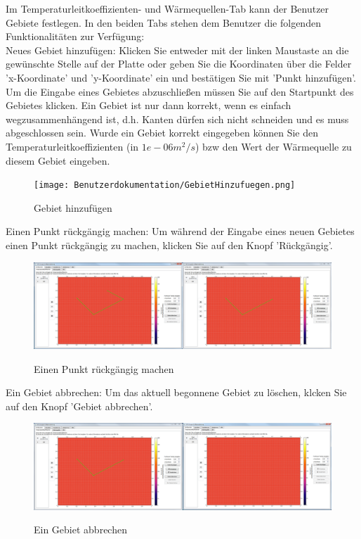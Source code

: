 \newpage
\noindent
Im Temperaturleitkoeffizienten- und Wärmequellen-Tab kann der Benutzer Gebiete festlegen. In den beiden Tabs stehen dem Benutzer die folgenden Funktionalitäten zur Verfügung:\\


\noindent
Neues Gebiet hinzufügen:
Klicken Sie entweder mit der linken Maustaste an die gewünschte Stelle auf der Platte oder geben Sie die Koordinaten über die Felder 'x-Koordinate' und 'y-Koordinate' ein und bestätigen Sie mit 'Punkt hinzufügen'. Um die Eingabe eines Gebietes abzuschließen müssen Sie auf den Startpunkt des Gebietes klicken. Ein Gebiet ist nur dann korrekt, wenn es einfach wegzusammenhängend ist, d.h. Kanten dürfen sich nicht schneiden und es muss abgeschlossen sein. Wurde ein Gebiet korrekt eingegeben können Sie den Temperaturleitkoeffizienten (in $1e-06 m^2/s$) bzw den Wert der Wärmequelle zu diesem Gebiet eingeben.
\begin{figure}[H]
\centering
\texttt{[image: Benutzerdokumentation/GebietHinzufuegen.png]}\\
\caption{Gebiet hinzufügen}
\label{Ein neues Gebiet hinzufügen}
\end{figure}

\newpage
\noindent
Einen Punkt rückgängig machen:
Um während der Eingabe eines neuen Gebietes einen Punkt rückgängig zu machen, klicken Sie auf den Knopf 'Rückgängig'.
\begin{figure}[H]
\centering
\includegraphics[scale=.25]{Benutzerdokumentation/PunktRueckgaengig.png}\\
\caption{Einen Punkt rückgängig machen}
\label{PunktRueckgaengig}
\end{figure}

\noindent
Ein Gebiet abbrechen: Um das aktuell begonnene Gebiet zu löschen, klcken Sie auf den Knopf 'Gebiet abbrechen'.
\begin{figure}[H]
\centering
\includegraphics[scale=.25]{Benutzerdokumentation/GebietAbbrechen.png}\\
\caption{Ein Gebiet abbrechen}
\label{GebietAbbrechen}
\end{figure}

